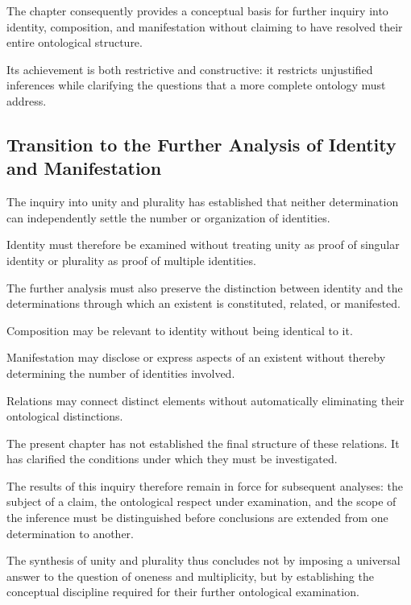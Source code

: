 The chapter consequently
provides a conceptual basis
for further inquiry into
identity, composition, and
manifestation without claiming
to have resolved their
entire ontological structure.

Its achievement is both
restrictive and constructive:
it restricts unjustified
inferences while clarifying
the questions that a more
complete ontology must
address.

\subsection{Transition to the Further Analysis of Identity and Manifestation}

The inquiry into unity and
plurality has established
that neither determination
can independently settle
the number or organization
of identities.

Identity must therefore
be examined without treating
unity as proof of singular
identity or plurality as
proof of multiple identities.

The further analysis must
also preserve the distinction
between identity and the
determinations through which
an existent is constituted,
related, or manifested.

Composition may be relevant
to identity without being
identical to it.

Manifestation may disclose
or express aspects of an
existent without thereby
determining the number
of identities involved.

Relations may connect
distinct elements without
automatically eliminating
their ontological distinctions.

The present chapter has
not established the final
structure of these relations.
It has clarified the conditions
under which they must be
investigated.

The results of this inquiry
therefore remain in force
for subsequent analyses:
the subject of a claim,
the ontological respect
under examination, and
the scope of the inference
must be distinguished
before conclusions are
extended from one determination
to another.

The synthesis of unity
and plurality thus concludes
not by imposing a universal
answer to the question
of oneness and multiplicity,
but by establishing the
conceptual discipline
required for their further
ontological examination.

